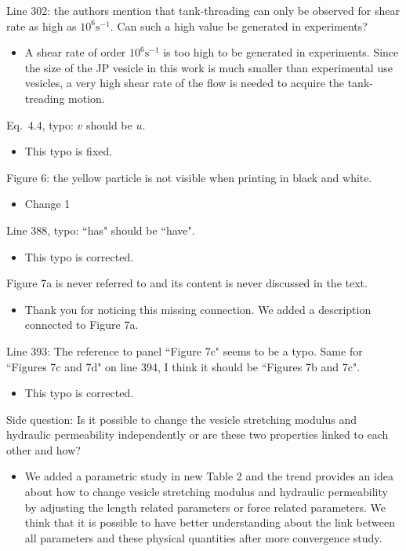 \documentclass[11pt]{article}
\newcommand{\comment}[1]{{\color{blue} #1}}
\begin{document}
\noindent
\comment{Line 302: the authors mention that tank-threading can only be
observed for shear rate as high as $10^{6}\text{s}^{-1}$. Can such a
high value be generated in experiments?}
\begin{itemize}
  \item A shear rate of order $10^{6}\text{s}^{-1}$ is too high to be generated in experiments.
Since the size of the JP vesicle in this work is much smaller than experimental use vesicles, 
a very high shear rate of the flow is needed to acquire the tank-treading motion.
\end{itemize}

\noindent
\comment{Eq.~4.4, typo: $v$ should be $u$.}
\begin{itemize}
  \item This typo is fixed.
\end{itemize}

\noindent
\comment{Figure 6: the yellow particle is not visible when printing in
black and white.}
\begin{itemize}
  \item Change 1 
\end{itemize}

\noindent
\comment{Line 388, typo: ``has" should be ``have".}
\begin{itemize}
  \item This typo is corrected.
\end{itemize}

\noindent
\comment{Figure 7a is never referred to and its content is never
discussed in the text.}
\begin{itemize}
  \item Thank you for noticing this missing connection. We added a description connected to Figure 7a.
\end{itemize}

\noindent
\comment{Line 393: The reference to panel ``Figure 7c" seems to be a
typo. Same for ``Figures 7c and 7d" on line 394, I think it should be
``Figures 7b and 7c".}
\begin{itemize}
  \item This typo is corrected.
\end{itemize}

\noindent
\comment{Side question: Is it possible to change the vesicle stretching
modulus and hydraulic permeability independently or are these two
properties linked to each other and how?}
\begin{itemize}
  \item We added a parametric study in new Table 2 and the trend provides an idea about 
how to change vesicle stretching modulus and hydraulic permeability by adjusting the length related parameters or force related parameters. We think that it is possible to have better understanding about the link between all parameters and these physical quantities after more 
convergence study.
\end{itemize}
\end{document}
